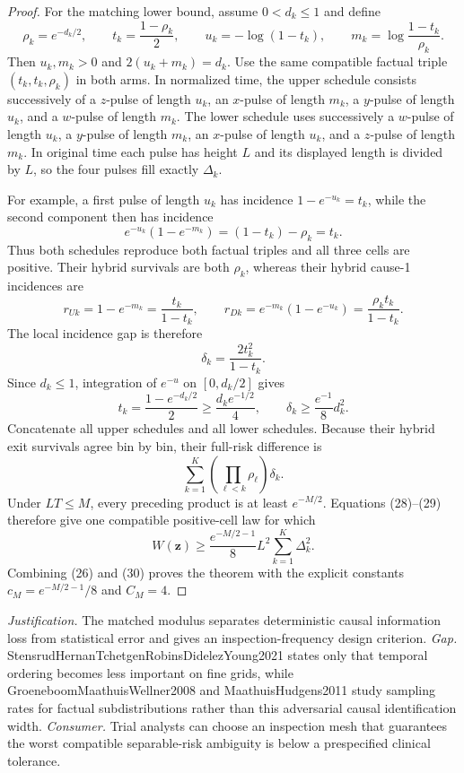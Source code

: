 \documentclass{article}
\begin{document}
\begin{proof}
For the matching lower bound, assume \(0<d_k\le1\) and define
\[
 \rho_k=e^{-d_k/2},\quad\quad t_k=\frac{1-\rho_k}{2},\quad\quad
 u_k=-\log(1-t_k),\quad\quad m_k=\log\frac{1-t_k}{\rho_k}.     \tag{27}
\]
Then \(u_k,m_k>0\) and \(2(u_k+m_k)=d_k\).  Use the same compatible factual triple \((t_k,t_k,\rho_k)\) in both arms.  In normalized time, the upper schedule consists successively of a \(z\)-pulse of length \(u_k\), an \(x\)-pulse of length \(m_k\), a \(y\)-pulse of length \(u_k\), and a \(w\)-pulse of length \(m_k\).  The lower schedule uses successively a \(w\)-pulse of length \(u_k\), a \(y\)-pulse of length \(m_k\), an \(x\)-pulse of length \(u_k\), and a \(z\)-pulse of length \(m_k\).  In original time each pulse has height \(L\) and its displayed length is divided by \(L\), so the four pulses fill exactly \(\Delta_k\).

For example, a first pulse of length \(u_k\) has incidence \(1-e^{-u_k}=t_k\), while the second component then has incidence
\[
 e^{-u_k}(1-e^{-m_k})=(1-t_k)-\rho_k=t_k.
\]
Thus both schedules reproduce both factual triples and all three cells are positive.  Their hybrid survivals are both \(\rho_k\), whereas their hybrid cause-1 incidences are
\[
 r_{Uk}=1-e^{-m_k}=\frac{t_k}{1-t_k},
 \quad\quad
 r_{Dk}=e^{-m_k}(1-e^{-u_k})=\frac{\rho_k t_k}{1-t_k}.
\]
The local incidence gap is therefore
\[
 \delta_k=\frac{2t_k^2}{1-t_k}.                             \tag{28}
\]
Since \(d_k\le1\), integration of \(e^{-u}\) on \([0,d_k/2]\) gives
\[
 t_k=\frac{1-e^{-d_k/2}}2\ge\frac{d_ke^{-1/2}}4,
 \quad\quad \delta_k\ge\frac{e^{-1}}8d_k^2.                   \tag{29}
\]
Concatenate all upper schedules and all lower schedules.  Because their hybrid exit survivals agree bin by bin, their full-risk difference is
\[
 \sum_{k=1}^K\left(\prod_{\ell<k}\rho_\ell\right)\delta_k.
\]
Under \(LT\le M\), every preceding product is at least \(e^{-M/2}\).  Equations (28)--(29) therefore give one compatible positive-cell law for which
\[
 W(\mathbf z)\ge \frac{e^{-M/2-1}}8L^2\sum_{k=1}^K\Delta_k^2.  \tag{30}
\]
Combining (26) and (30) proves the theorem with the explicit constants \(c_M=e^{-M/2-1}/8\) and \(C_M=4\).
\end{proof}
\par\smallskip\noindent \textit{Justification.} The matched modulus separates deterministic causal information loss from statistical error and gives an inspection-frequency design criterion. \textit{Gap.} StensrudHernanTchetgenRobinsDidelezYoung2021 states only that temporal ordering becomes less important on fine grids, while GroeneboomMaathuisWellner2008 and MaathuisHudgens2011 study sampling rates for factual subdistributions rather than this adversarial causal identification width. \textit{Consumer.} Trial analysts can choose an inspection mesh that guarantees the worst compatible separable-risk ambiguity is below a prespecified clinical tolerance.
\end{document}
